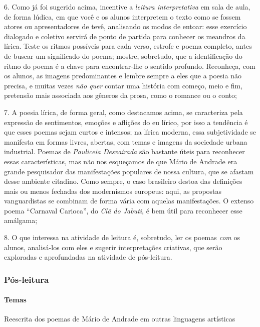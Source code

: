 \documentclass[11pt]{extarticle}
\begin{document}
6. Como já foi sugerido acima, incentive a \emph{leitura interpretativa}
em sala de aula, de forma lúdica, em que você e os alunos interpretem o
texto como se fossem atores ou apresentadores de tevê, analisando os
modos de entoar: esse exercício dialogado e coletivo servirá de ponto de
partida para conhecer os meandros da lírica. Teste os ritmos possíveis
para cada verso, estrofe e poema completo, antes de buscar um
significado do poema; mostre, sobretudo, que a identificação do ritmo do
poema é a chave para encontrar-lhe o sentido profundo. Reconheça, com os
alunos, as imagens predominantes e lembre sempre a eles que a poesia não
precisa, e muitas vezes \emph{não quer} contar uma história com começo,
meio e fim, pretensão mais associada aos gêneros da prosa, como o
romance ou o conto;

7. A poesia lírica, de forma geral, como destacamos acima, se
caracteriza pela expressão de sentimentos, emoções e aflições do eu
lírico, por isso a tendência é que esses poemas sejam curtos e intensos;
na lírica moderna, essa subjetividade se manifesta em formas livres,
abertas, com temas e imagens da sociedade urbana industrial. Poemas de
\emph{Pauliceia Desvairada} são bastante úteis para reconhecer essas
características, mas não nos esqueçamos de que Mário de Andrade era
grande pesquisador das manifestações populares de nossa cultura, que se
afastam desse ambiente citadino. Como sempre, o caso brasileiro destoa
das definições mais ou menos fechadas dos modernismos europeus: aqui, as
propostas vanguardistas se combinam de forma vária com aquelas
manifestações. O extenso poema ``Carnaval Carioca'', do \emph{Clã do
Jabuti}, é bem útil para reconhecer esse amálgama;

8. O que interessa na atividade de leitura é, sobretudo, ler os poemas
\emph{com} os alunos, analisá-los com eles e sugerir interpretações
criativas, que serão exploradas e aprofundadas na atividade de
pós-leitura.

\subsubsection{Pós-leitura}



\paragraph{Temas} Reescrita dos poemas de Mário de Andrade em outras
linguagens artísticas
\end{document}
